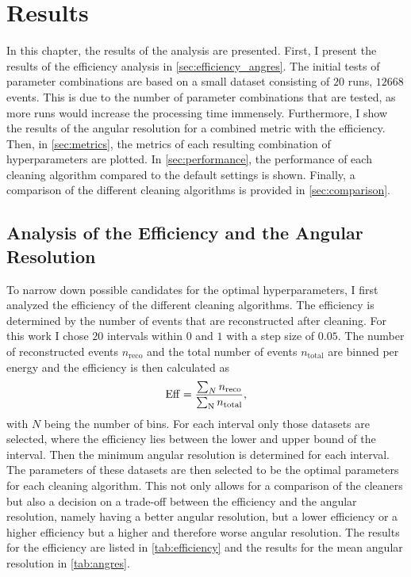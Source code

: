 \chapter{Results}
\label{ch:results}

In this chapter, the results of the analysis are presented. First, I present the results of the
efficiency analysis in \autoref{sec:efficiency_angres}. The initial tests of parameter combinations
are based on a small dataset consisting of \(\num{20}\) runs, \ie \(\num{12668}\) events. This is
due to the number of parameter combinations that are tested, as more runs would increase the
processing time immensely. Furthermore, I show the results of the angular resolution for a combined
metric with the efficiency. Then, in \autoref{sec:metrics}, the metrics of each resulting combination
of hyperparameters are plotted. In \autoref{sec:performance}, the performance of each cleaning
algorithm compared to the default settings is shown. Finally, a comparison of the different
cleaning algorithms is provided in \autoref{sec:comparison}.


\section{Analysis of the Efficiency and the Angular Resolution}
\label{sec:efficiency_angres}

To narrow down possible candidates for the optimal hyperparameters, I first analyzed the efficiency
of the different cleaning algorithms. The efficiency is determined by the number of events that are
reconstructed after cleaning. For this work I chose \(\num{20}\) intervals within \(\num{0}\) and
\(\num{1}\) with a step size of \(\num{0.05}\). The number of reconstructed events \(n_{\mathrm{reco}}\)
and the total number of events \(n_{\mathrm{total}}\) are binned per energy and the efficiency is then
calculated as
\begin{equation}\label{eq:efficiency_sum}
    \operatorname{Eff} = \frac{\sum_{N} n_{\mathrm{reco}}}{\sum_{\mathrm{N}} n_{\mathrm{total}}},
\end{equation}
with \(N\) being the number of bins. For each interval only those datasets are selected, where the efficiency
lies between the lower and upper bound of the interval. Then the minimum angular resolution is
determined for each interval. The parameters of these datasets are then selected to be the optimal
parameters for each cleaning algorithm. This not only allows for a comparison of the cleaners but also
a decision on a trade-off between the efficiency and the angular resolution, namely having a better
angular resolution, but a lower efficiency or a higher efficiency but a higher and therefore worse
angular resolution. The results for the efficiency are listed in \autoref{tab:efficiency} and
the results for the mean angular resolution in \autoref{tab:angres}.


